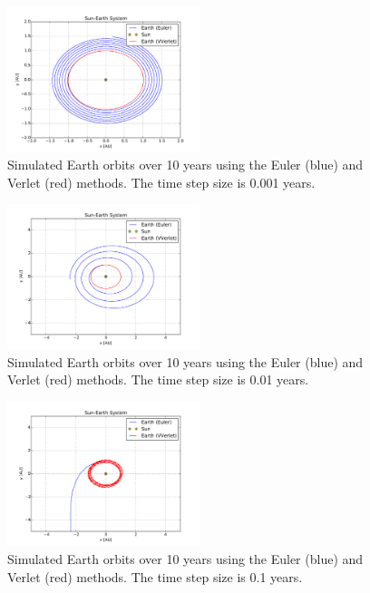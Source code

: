 \documentclass[10pt,showpacs,preprintnumbers,footinbib,amsmath,amssymb,aps,prl,twocolumn,groupedaddress,superscriptaddress,showkeys]{revtex4-1}
\begin{document}
\begin{figure}
\centering
	\includegraphics[width=0.5\textwidth]{figures/se001.pdf}
	\caption{Simulated Earth orbits over 10 years using the Euler (blue) and
	Verlet (red) methods. The time step size is 0.001 years.}
	\label{fig:se001}
\end{figure}

\begin{figure}
\centering
	\includegraphics[width=0.5\textwidth]{figures/se01.pdf}
	\caption{Simulated Earth orbits over 10 years using the Euler (blue) and
	Verlet (red) methods. The time step size is 0.01 years.}
	\label{fig:se01}
\end{figure}

\begin{figure}
\centering
	\includegraphics[width=0.5\textwidth]{figures/se1.pdf}
	\caption{Simulated Earth orbits over 10 years using the Euler (blue) and
	Verlet (red) methods. The time step size is 0.1 years.}
	\label{fig:se1}
\end{figure}
\end{document}
